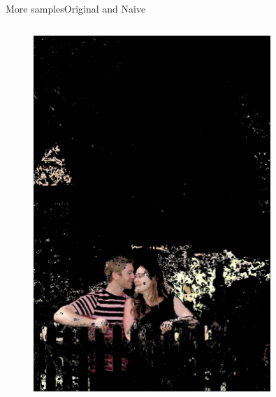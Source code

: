 \documentclass{beamer}
\begin{document}
\begin{frame}{More samples}{Original and Naive}
\begin{columns}
\begin{column}{5cm}
\begin{figure}
		\includegraphics[width=0.8\textwidth]{label0} 
		\end{figure}
\end{column}
\end{columns}
\end{frame}
\end{document}
